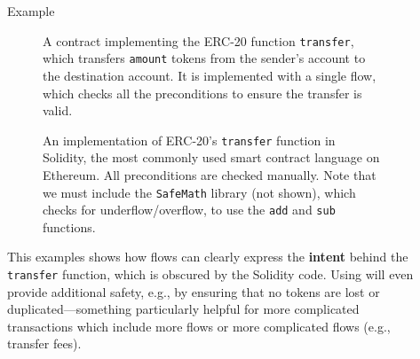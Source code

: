 \documentclass[usenames, dvipsnames, final]{beamer}
\newlength{\sepwidth}
\newlength{\colwidth}
\newcommand{\separatorcolumn}{\begin{column}{\sepwidth}\end{column}}
\begin{document}
\begin{frame}[t]
\begin{columns}[t]
\separatorcolumn

\begin{column}{\colwidth}

  \begin{block}{Example}
    \begin{figure}[h]
        \centering
        
        \caption{A \langName contract implementing the ERC-20 function \lstinline{transfer}, which transfers \lstinline{amount} tokens from the sender's account to the destination account.
            It is implemented with a single flow, which checks all the preconditions to ensure the transfer is valid.}
        \label{fig:erc20-transfer-flow}
    \end{figure}
    \begin{figure}[h]
        \centering
        
        \caption{An implementation of ERC-20's \lstinline{transfer} function in Solidity, the most commonly used smart contract language on Ethereum.
            All preconditions are checked manually.
            Note that we must include the \lstinline{SafeMath} library (not shown), which checks for underflow/overflow, to use the \lstinline{add} and \lstinline{sub} functions.}
        \label{fig:erc20-transfer-sol}
    \end{figure}

      This examples shows how flows can clearly express the \textbf{intent} behind the \lstinline{transfer} function, which is obscured by the Solidity code.
      Using \langName will even provide additional safety, e.g., by ensuring that no tokens are lost or duplicated---something particularly helpful for more complicated transactions which include more flows or more complicated flows (e.g., transfer fees).
  \end{block}
\end{column}

\separatorcolumn


\end{columns}
\end{frame}
\end{document}
